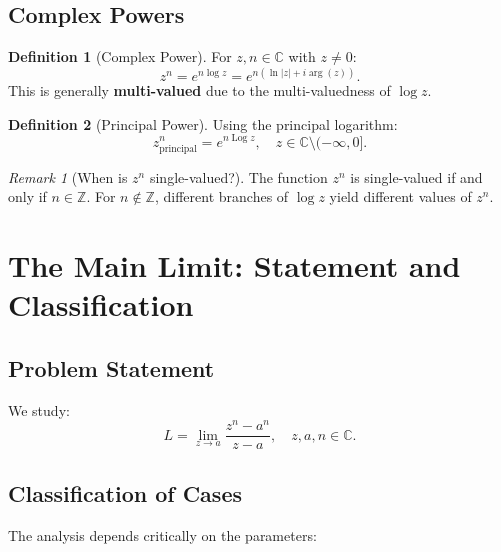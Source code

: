 \documentclass{article}
\theoremstyle{definition}
\newtheorem{definition}{Definition}[section]
\theoremstyle{remark}
\newtheorem{remark}{Remark}[section]
\newcommand{\C}{\mathbb{C}}
\newcommand{\Z}{\mathbb{Z}}
\newcommand{\Log}{\operatorname{Log}}
\begin{document}
\subsection{Complex Powers}

\begin{definition}[Complex Power]
For $z, n \in \C$ with $z \neq 0$:
\begin{equation}
z^n = e^{n \log z} = e^{n(\ln|z| + i\arg(z))}.
\label{eq:complex_power}
\end{equation}
This is generally \textbf{multi-valued} due to the multi-valuedness of $\log z$.
\end{definition}

\begin{definition}[Principal Power]
Using the principal logarithm:
\begin{equation}
z^n_{\text{principal}} = e^{n \Log z}, \quad z \in \C \setminus (-\infty, 0].
\end{equation}
\end{definition}

\begin{remark}[When is $z^n$ single-valued?]
The function $z^n$ is single-valued if and only if $n \in \Z$. For $n \notin \Z$, different branches of $\log z$ yield different values of $z^n$.
\end{remark}

\section{The Main Limit: Statement and Classification}

\subsection{Problem Statement}

We study:
\begin{equation}
L = \lim_{z \to a} \frac{z^n - a^n}{z - a}, \quad z, a, n \in \C.
\label{eq:main_limit}
\end{equation}

\subsection{Classification of Cases}

The analysis depends critically on the parameters:
\end{document}

